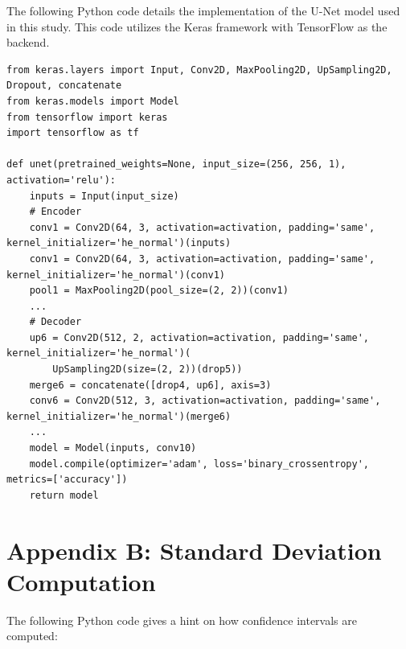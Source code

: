 \documentclass[12pt,a4paper]{article}
\begin{document}
The following Python code details the implementation of the U-Net model used in this study. This code utilizes the Keras framework with TensorFlow as the backend.

\begin{lstlisting}
from keras.layers import Input, Conv2D, MaxPooling2D, UpSampling2D, Dropout, concatenate
from keras.models import Model
from tensorflow import keras
import tensorflow as tf

def unet(pretrained_weights=None, input_size=(256, 256, 1), activation='relu'):
    inputs = Input(input_size)
    # Encoder
    conv1 = Conv2D(64, 3, activation=activation, padding='same', kernel_initializer='he_normal')(inputs)
    conv1 = Conv2D(64, 3, activation=activation, padding='same', kernel_initializer='he_normal')(conv1)
    pool1 = MaxPooling2D(pool_size=(2, 2))(conv1)
    ...
    # Decoder
    up6 = Conv2D(512, 2, activation=activation, padding='same', kernel_initializer='he_normal')(
        UpSampling2D(size=(2, 2))(drop5))
    merge6 = concatenate([drop4, up6], axis=3)
    conv6 = Conv2D(512, 3, activation=activation, padding='same', kernel_initializer='he_normal')(merge6)
    ...
    model = Model(inputs, conv10)
    model.compile(optimizer='adam', loss='binary_crossentropy', metrics=['accuracy'])
    return model
\end{lstlisting}

\newpage

\section*{Appendix B: Standard Deviation Computation}

The following Python code gives a hint on how confidence intervals are computed:
\end{document}
